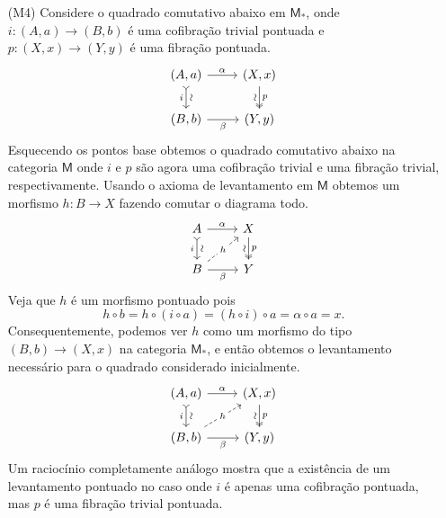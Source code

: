 \begin{exem}
\begin{enumerate}
  \item[(M4)] Considere o quadrado comutativo abaixo em $\mathsf{M}_{*}$, onde $i: (A,a) \to (B,b)$ é uma cofibração trivial pontuada e $p: (X,x) \to (Y,y)$ é uma fibração pontuada.
    \begin{displaymath}
      \begin{tikzcd}
        (A,a)
        \arrow[r, "\alpha"]
        \arrow[d, tail, "i" {swap}, "\sim" {sloped}]
        & (X,x)
        \arrow[d, two heads, "p", "\sim" {swap,sloped}]
        \\ (B,b)
        \arrow[r, "\beta" swap]
        & (Y,y)
      \end{tikzcd}
    \end{displaymath}
    Esquecendo os pontos base obtemos o quadrado comutativo abaixo na categoria $\mathsf{M}$ onde $i$ e $p$ são agora uma cofibração trivial e uma fibração trivial, respectivamente.
    Usando o axioma de levantamento em $\mathsf{M}$ obtemos um morfismo $h: B \to X$ fazendo comutar o diagrama todo.
    \begin{displaymath}
      \begin{tikzcd}
        A
        \arrow[r, "\alpha"]
        \arrow[d, tail, "i" {swap}, "\sim" {sloped}]
        & X
        \arrow[d, two heads, "p", "\sim" {swap,sloped}]
        \\ B
        \arrow[r, "\beta" swap]
        \arrow[ru, dashed, "h" description]
        & Y
      \end{tikzcd}
    \end{displaymath}
    Veja que $h$ é um morfismo pontuado pois
    \begin{displaymath}
      h \circ b = h \circ (i \circ a) = (h \circ i) \circ a = \alpha \circ a = x.
    \end{displaymath}
    Consequentemente, podemos ver $h$ como um morfismo do tipo $(B,b) \to (X,x)$ na categoria $\mathsf{M}_{*}$, e então obtemos o levantamento necessário para o quadrado considerado inicialmente.
    \begin{displaymath}
      \begin{tikzcd}
        (A,a)
        \arrow[r, "\alpha"]
        \arrow[d, tail, "i" {swap}, "\sim" {sloped}]
        & (X,x)
        \arrow[d, two heads, "p", "\sim" {swap,sloped}]
        \\ (B,b)
        \arrow[r, "\beta" swap]
        \arrow[ru, dashed, "h" description]
        & (Y,y)
      \end{tikzcd}
    \end{displaymath}
    Um raciocínio completamente análogo mostra que a existência de um levantamento pontuado no caso onde $i$ é apenas uma cofibração pontuada, mas $p$ é uma fibração trivial pontuada.
    

\end{enumerate}
\end{exem}
